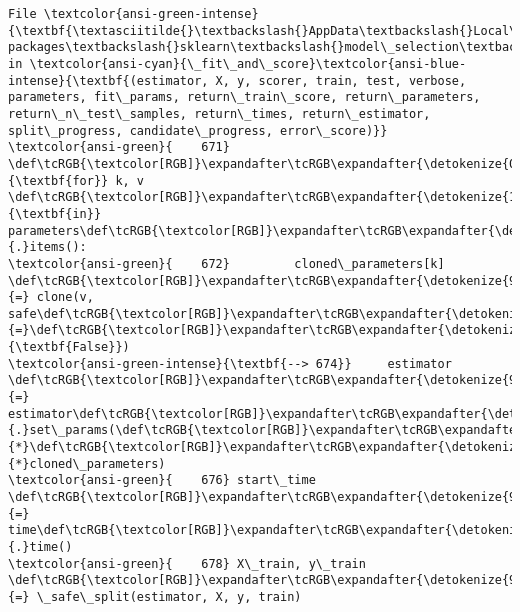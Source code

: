 \documentclass[11pt]{article}
\begin{document}
\begin{Verbatim}[commandchars=\\\{\}, frame=single, framerule=2mm, rulecolor=\color{outerrorbackground}]
File \textcolor{ansi-green-intense}{\textbf{\textasciitilde{}\textbackslash{}AppData\textbackslash{}Local\textbackslash{}anaconda3\textbackslash{}lib\textbackslash{}site-packages\textbackslash{}sklearn\textbackslash{}model\_selection\textbackslash{}\_validation.py:674}}, in \textcolor{ansi-cyan}{\_fit\_and\_score}\textcolor{ansi-blue-intense}{\textbf{(estimator, X, y, scorer, train, test, verbose, parameters, fit\_params, return\_train\_score, return\_parameters, return\_n\_test\_samples, return\_times, return\_estimator, split\_progress, candidate\_progress, error\_score)}}
\textcolor{ansi-green}{    671}     \def\tcRGB{\textcolor[RGB]}\expandafter\tcRGB\expandafter{\detokenize{0,135,0}}{\textbf{for}} k, v \def\tcRGB{\textcolor[RGB]}\expandafter\tcRGB\expandafter{\detokenize{175,0,255}}{\textbf{in}} parameters\def\tcRGB{\textcolor[RGB]}\expandafter\tcRGB\expandafter{\detokenize{98,98,98}}{.}items():
\textcolor{ansi-green}{    672}         cloned\_parameters[k] \def\tcRGB{\textcolor[RGB]}\expandafter\tcRGB\expandafter{\detokenize{98,98,98}}{=} clone(v, safe\def\tcRGB{\textcolor[RGB]}\expandafter\tcRGB\expandafter{\detokenize{98,98,98}}{=}\def\tcRGB{\textcolor[RGB]}\expandafter\tcRGB\expandafter{\detokenize{0,135,0}}{\textbf{False}})
\textcolor{ansi-green-intense}{\textbf{--> 674}}     estimator \def\tcRGB{\textcolor[RGB]}\expandafter\tcRGB\expandafter{\detokenize{98,98,98}}{=} estimator\def\tcRGB{\textcolor[RGB]}\expandafter\tcRGB\expandafter{\detokenize{98,98,98}}{.}set\_params(\def\tcRGB{\textcolor[RGB]}\expandafter\tcRGB\expandafter{\detokenize{98,98,98}}{*}\def\tcRGB{\textcolor[RGB]}\expandafter\tcRGB\expandafter{\detokenize{98,98,98}}{*}cloned\_parameters)
\textcolor{ansi-green}{    676} start\_time \def\tcRGB{\textcolor[RGB]}\expandafter\tcRGB\expandafter{\detokenize{98,98,98}}{=} time\def\tcRGB{\textcolor[RGB]}\expandafter\tcRGB\expandafter{\detokenize{98,98,98}}{.}time()
\textcolor{ansi-green}{    678} X\_train, y\_train \def\tcRGB{\textcolor[RGB]}\expandafter\tcRGB\expandafter{\detokenize{98,98,98}}{=} \_safe\_split(estimator, X, y, train)


\end{Verbatim}
\end{document}
